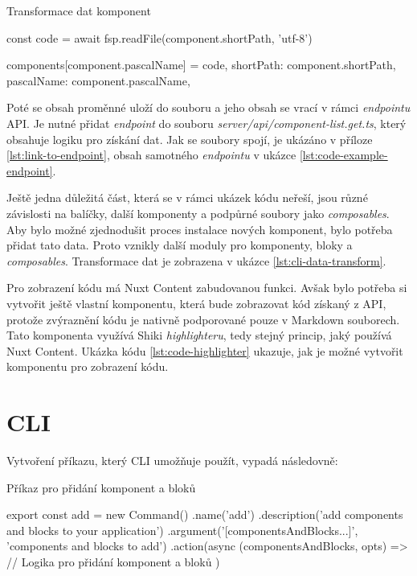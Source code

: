 \clearpage

\begin{listing}[H]
    \caption{Transformace dat komponent}
    \label{lst:module}
    \begin{code}
const code = await fsp.readFile(component.shortPath, 'utf-8')

components[component.pascalName] = {
    code,
    shortPath: component.shortPath,
    pascalName: component.pascalName,
}
\end{code}
\end{listing}

Poté se obsah proměnné uloží do souboru a jeho obsah se vrací v rámci \emph{endpointu} API. Je nutné přidat \emph{endpoint} do souboru \emph{server/api/component-list.get.ts}, který obsahuje logiku pro získání dat. Jak se soubory spojí, je ukázáno v příloze \ref{lst:link-to-endpoint}, obsah samotného \emph{endpointu} v ukázce \ref{lst:code-example-endpoint}.

Ještě jedna důležitá část, která se v rámci ukázek kódu neřeší, jsou různé závislosti na balíčky, další komponenty a podpůrné soubory jako \emph{composables}. Aby bylo možné zjednodušit proces instalace nových komponent, bylo potřeba přidat tato data. Proto vznikly další moduly pro komponenty, bloky a \emph{composables}. Transformace dat je zobrazena v ukázce \ref{lst:cli-data-transform}.

Pro zobrazení kódu má Nuxt Content zabudovanou funkci. \cite{NuxtContentCodeHighlighting} Avšak bylo potřeba si vytvořit ještě vlastní komponentu, která bude zobrazovat kód získaný z API, protože zvýraznění kódu je nativně podporované pouze v Markdown souborech. Tato komponenta využívá Shiki \emph{highlighteru}, tedy stejný princip, jaký používá Nuxt Content. Ukázka kódu \ref{lst:code-highlighter} ukazuje, jak je možné vytvořit komponentu pro zobrazení kódu.

\section{CLI}
Vytvoření příkazu, který CLI umožňuje použít, vypadá následovně:

\begin{listing}[H]
    \caption{Příkaz pro přidání komponent a bloků}
    \label{lst:cli-install}
    \begin{code}
export const add = new Command()
.name('add')
.description('add components and blocks to your application')
.argument('[componentsAndBlocks...]', 'components and blocks to add')
.action(async (componentsAndBlocks, opts) => {
    // Logika pro přidání komponent a bloků
})        
\end{code}
\end{listing}

